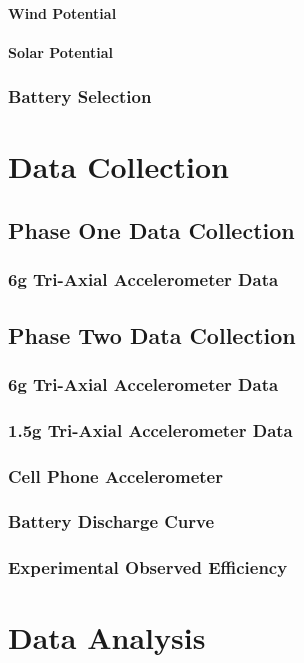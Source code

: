 \documentclass[12pt]{report}
\begin{document}
			\subsubsection{Wind Potential}
			\subsubsection{Solar Potential}
		\subsection{Battery Selection}
		
\chapter{Data Collection}
	\section{Phase One Data Collection}
		\subsection{6g Tri-Axial Accelerometer Data}
	\section{Phase Two Data Collection}
		\subsection{6g Tri-Axial Accelerometer Data}
		\subsection{1.5g Tri-Axial Accelerometer Data}
		\subsection{Cell Phone Accelerometer}
		\subsection{Battery Discharge Curve}
		\subsection{Experimental Observed Efficiency}
\chapter{Data Analysis}
\end{document}
